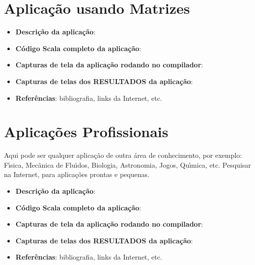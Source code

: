     \section{Aplica\c{c}\~{a}o usando Matrizes}
    \begin{itemize}
      \item \textbf{Descri\c{c}\~{a}o da aplica\c{c}\~{a}o}:
      \item \textbf{C\'{o}digo Scala completo da aplica\c{c}\~{a}o}:
      \item \textbf{Capturas de tela da aplica\c{c}\~{a}o rodando no compilador}:
      \item \textbf{Capturas de telas dos RESULTADOS da aplica\c{c}\~{a}o}:
      \item \textbf{Refer\^{e}ncias}: bibliografia, links da Internet, etc.
    \end{itemize}

    \section{Aplica\c{c}\~{o}es Profissionais}
    Aqui pode ser qualquer aplica\c{c}\~{a}o de outra \'{a}rea de conhecimento, por exemplo: F\'{\i}sica, Mec\~{a}nica de Flu\'{\i}dos, Biologia, Astronomia, Jogos, Qu\'{\i}mica, etc. Pesquisar na Internet, para aplica\c{c}\~{o}es prontas e pequenas.
    \begin{itemize}
      \item \textbf{Descri\c{c}\~{a}o da aplica\c{c}\~{a}o}:
      \item \textbf{C\'{o}digo Scala completo da aplica\c{c}\~{a}o}:
      \item \textbf{Capturas de tela da aplica\c{c}\~{a}o rodando no compilador}:
      \item \textbf{Capturas de telas dos RESULTADOS da aplica\c{c}\~{a}o}:
      \item \textbf{Refer\^{e}ncias}: bibliografia, links da Internet, etc.
    \end{itemize}


